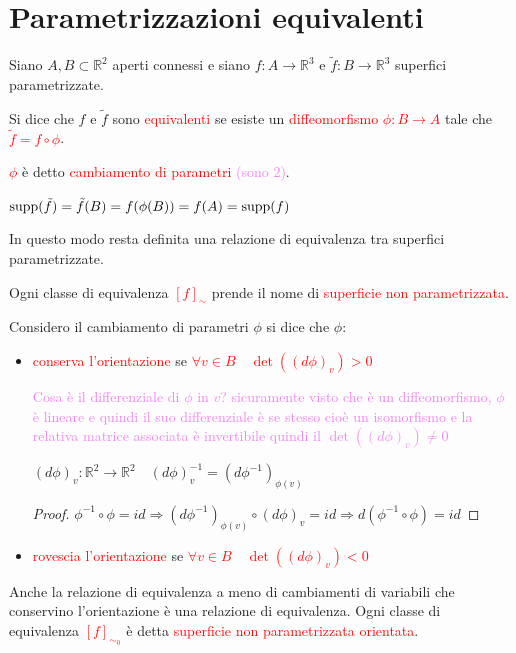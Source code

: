     \section{Parametrizzazioni equivalenti}
        \begin{definizione}
        Siano $A,B \subset \mathbb{R}^2$ aperti connessi e siano
        $f \colon A \to \mathbb{R}^3$ e $\tilde{f} \colon B \to \mathbb{R}^3$ superfici parametrizzate.

        Si dice che $f$ e $\tilde{f}$ sono \textcolor{red}{equivalenti} se esiste un \textcolor{red}{diffeomorfismo $\phi \colon B \to A$ }
        tale che \textcolor{red}{$\tilde{f} = f \circ \phi$}.

        \textcolor{red}{$\phi$} è detto \textcolor{red}{cambiamento di parametri \textcolor{violet}{(sono $2$)}}.
        
        \textcolor{blu}{$\operatorname{supp}(\tilde{f}) = \tilde{f}(B) = f(\phi(B)) = f(A)= \operatorname{supp}(f)$}

        In questo modo resta definita una relazione di equivalenza tra superfici parametrizzate.

        Ogni classe di equivalenza \textcolor{red}{$[f]_{\sim}$} prende il nome di \textcolor{red}{superficie non parametrizzata}.
        \end{definizione}
        \begin{definizione}
        Considero il cambiamento di parametri $\phi$ si dice che $\phi$:
        \begin{itemize}
            \item \textcolor{red}{conserva l'orientazione} se \textcolor{red}{$\forall v \in B \quad \det( (d \phi)_v ) > 0$}
    
            \textcolor{violet}{Cosa è il differenziale di $\phi$ in $v$? sicuramente visto che è un
            diffeomorfismo, $\phi$ è lineare e quindi il suo differenziale è se stesso cioè un isomorfismo e la relativa
            matrice associata è invertibile quindi il $\det( (d \phi)_v ) \neq 0$} 
            
            \textcolor{blu}{$ (d \phi)_v : \mathbb{R}^2 \to \mathbb{R}^2 \quad ( d \phi)^{-1}_v = (d \phi^{-1})_{\phi(v)}$}
            \begin{proof}
            $\phi^{-1} \circ \phi = id \Rightarrow \left(d \phi^{-1}\right)_{\phi(v)} \circ (d \phi)_v = id \Rightarrow d \left(\phi^{-1} \circ \phi \right)=id$
            \end{proof}
            \item \textcolor{red}{rovescia l'orientazione} se \textcolor{red}{$\forall v \in B \quad \det( (d \phi)_v ) < 0$}
        \end{itemize}
        Anche la relazione di equivalenza a meno di cambiamenti di variabili che conservino l'orientazione è 
        una relazione di equivalenza. Ogni classe di equivalenza \textcolor{red}{$[f]_{\sim_0}$} è detta 
        \textcolor{red}{superficie non parametrizzata orientata}.
        \end{definizione}
